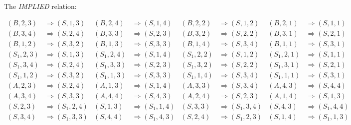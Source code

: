 The \emph{IMPLIED} relation:
\begin{figure*}
\begin{align*} %
(B,2,3)  & \Rightarrow (S,1,3)  & (B,2,4)  & \Rightarrow (S,1,4)  & (B,2,2)  & \Rightarrow (S,1,2) & (B,2,1)  & \Rightarrow (S,1,1)
\\
(B,3,4)  & \Rightarrow (S,2,4)  & (B,3,3)  & \Rightarrow (S,2,3)  & (B,3,2)  & \Rightarrow (S,2,2) & (B,3,1)  & \Rightarrow (S,2,1)
\\
(B,1,2)  & \Rightarrow (S,3,2)  & (B,1,3)  & \Rightarrow (S,3,3)  & (B,1,4)  & \Rightarrow (S,3,4) & (B,1,1)  & \Rightarrow (S,3,1)
\\ %
(S_1,2,3)  & \Rightarrow (S,1,3) & (S_1,2,4)  & \Rightarrow (S,1,4) & (S_1,2,2)  & \Rightarrow (S,1,2) & (S_1,2,1)  & \Rightarrow (S,1,1)
\\
(S_1,3,4)  & \Rightarrow (S,2,4)  & (S_1,3,3)  & \Rightarrow (S,2,3)  & (S_1,3,2)  & \Rightarrow (S,2,2) & (S_1,3,1)  & \Rightarrow (S,2,1)
\\
(S_1,1,2)  & \Rightarrow (S,3,2)  &  (S_1,1,3) & \Rightarrow (S,3,3)  & (S_1,1,4)  & \Rightarrow (S,3,4)  & (S_1,1,1)  & \Rightarrow (S,3,1)
\\ %
(A,2,3)  & \Rightarrow (S,2,4)    &  (A,1,3) & \Rightarrow (S,1,4)    & (A,3,3)  & \Rightarrow (S,3,4)    & (A,4,3)  & \Rightarrow (S,4,4)
\\
(A,3,4)  & \Rightarrow (S,3,3)    &  (A,4,4) & \Rightarrow (S,4,3)    & (A,2,4)  & \Rightarrow (S,2,3)    & (A,1,4)  & \Rightarrow (S,1,3)
\\ %
(S,2,3)  & \Rightarrow (S_1,2,4)  &  (S,1,3) & \Rightarrow (S_1,1,4)  & (S,3,3)  & \Rightarrow (S_1,3,4)  & (S,4,3)  & \Rightarrow (S_1,4,4)
\\
(S,3,4)  & \Rightarrow (S_1,3,3)  &  (S,4,4) & \Rightarrow (S_1,4,3)  & (S,2,4)  & \Rightarrow (S_1,2,3)  & (S,1,4)  & \Rightarrow (S_1,1,3)
\end{align*}
\end{figure*}


